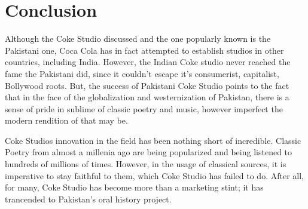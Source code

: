 \documentclass{article}
\begin{document}
\section{Conclusion}

Although the Coke Studio discussed and the one popularly known is the Pakistani
one, Coca Cola has in fact attempted to establish studios in other countries,
including India. However, the Indian Coke studio never reached the fame the
Pakistani did, since it couldn't escape it's consumerist, capitalist, Bollywood
roots. But, the success of Pakistani Coke Studio points to the fact that in the
face of the globalization and westernization of Pakistan, there is a sense of
pride in sublime of classic poetry and music, however imperfect the modern
rendition of that may be. 

Coke Studios innovation in the field has been nothing short of incredible.
Classic Poetry from almost a millenia ago are being popularized and being
listened to hundreds of millions of times.  However, in the usage of classical
sources, it is imperative to stay faithful to them, which Coke Studio has failed
to do. After all, for many, Coke Studio has become more than a marketing stint; 
it has trancended to Pakistan's oral history project. 

\printbibliography
\end{document}
